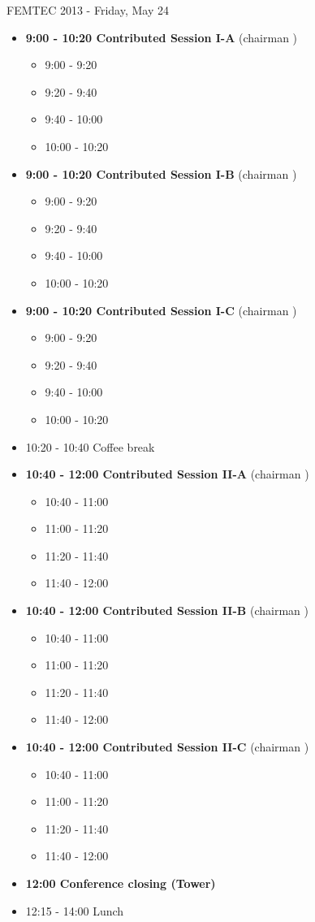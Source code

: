 \documentclass[10pt, A4]{article}%
\begin{document}
\centerline{\huge FEMTEC 2013 - Friday, May 24}
\vspace{4mm}
\begin{itemize}    
\item {\bf 9:00 - 10:20 Contributed Session I-A} (chairman ) 
  \begin{itemize}
    \item 9:00 - 9:20 
    \item 9:20 - 9:40 
    \item 9:40 - 10:00 
    \item 10:00 - 10:20  
  \end{itemize}
  \item {\bf 9:00 - 10:20 Contributed Session I-B} (chairman ) 
  \begin{itemize}
    \item 9:00 - 9:20 
    \item 9:20 - 9:40 
    \item 9:40 - 10:00 
    \item 10:00 - 10:20      
  \end{itemize}
    \item {\bf 9:00 - 10:20 Contributed Session I-C} (chairman ) 
  \begin{itemize}
    \item 9:00 - 9:20 
    \item 9:20 - 9:40 
    \item 9:40 - 10:00 
    \item 10:00 - 10:20      
  \end{itemize}
  \item 10:20 - 10:40 Coffee break
  \item {\bf 10:40 - 12:00 Contributed Session II-A} (chairman ) 
  \begin{itemize}
    \item 10:40 - 11:00 
    \item 11:00 - 11:20 
    \item 11:20 - 11:40 
    \item 11:40 - 12:00 
  \end{itemize}
  \item {\bf 10:40 - 12:00 Contributed Session II-B} (chairman ) 
  \begin{itemize}
    \item 10:40 - 11:00 
    \item 11:00 - 11:20 
    \item 11:20 - 11:40 
    \item 11:40 - 12:00  
  \end{itemize}
  \item {\bf 10:40 - 12:00 Contributed Session II-C} (chairman ) 
  \begin{itemize}
    \item 10:40 - 11:00 
    \item 11:00 - 11:20 
    \item 11:20 - 11:40 
    \item 11:40 - 12:00 
  \end{itemize}
  \item {\bf 12:00 Conference closing (Tower)}
  \item 12:15 - 14:00 Lunch
\newpage
\end{itemize}
\end{document}
